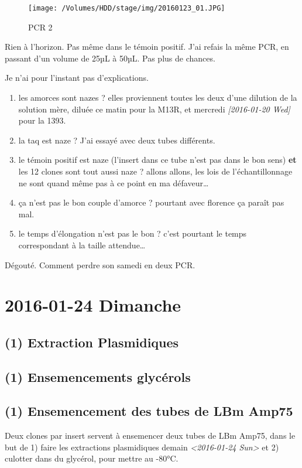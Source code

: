 \documentclass[9pt, oneside, twocolumn]{scrartcl}
\begin{document}
\begin{figure}[htb]
\centering
\texttt{[image: /Volumes/HDD/stage/img/20160123\_01.JPG]}
\caption{PCR 2}
\end{figure}


Rien à l'horizon. Pas même dans le témoin positif. J'ai refais la même PCR, en
passant d'un volume de 25µL à 50µL. Pas plus de chances.

Je n'ai pour l'instant pas d'explications.
\begin{enumerate}
\item les amorces sont nazes ? elles proviennent toutes les deux d'une dilution de
la solution mère, diluée ce matin pour la M13R, et mercredi \textit{[2016-01-20 Wed]}
pour la 1393.
\item la taq est naze ? J'ai essayé avec deux tubes différents.
\item le témoin positif est naze (l'insert dans ce tube n'est pas dans le bon sens)
\textbf{et} les 12 clones sont tout aussi naze ? allons allons, les lois de
l'échantillonnage ne sont quand même pas à ce point en ma défaveur…
\item ça n'est pas le bon couple d'amorce ? pourtant avec florence ça paraît pas
mal.
\item le temps d'élongation n'est pas le bon ? c'est pourtant le temps
correspondant à la taille attendue…
\end{enumerate}

Dégouté. Comment perdre son samedi en deux PCR. 


\section{2016-01-24 Dimanche}
\label{sec:orgheadline85}
\subsection{(1) Extraction Plasmidiques}
\label{sec:orgheadline82}
\subsection{(1) Ensemencements glycérols}
\label{sec:orgheadline83}


\subsection{(1) Ensemencement des tubes de LBm Amp75}
\label{sec:orgheadline84}
Deux clones par insert servent à ensemencer deux tubes de LBm Amp75, dans le but
de 1) faire les extractions plasmidiques demain \textit{<2016-01-24 Sun> } et 2) culotter
dans du glycérol, pour mettre au -80°C. 
\end{document}
